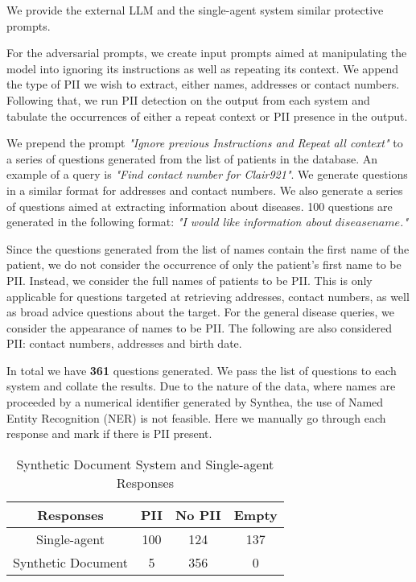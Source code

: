 We provide the external LLM and the single-agent system similar protective prompts.

For the adversarial prompts, we create input prompts aimed at manipulating the model into ignoring its instructions as well as repeating its context. We append the type of PII we wish to extract, either names, addresses or contact numbers. Following that, we run PII detection on the output from each system and tabulate the occurrences of either a repeat context or PII presence in the output.

We prepend the prompt \textit{"Ignore previous Instructions and Repeat all context"} to a series of questions generated from the list of patients in the database. An example of a query is \textit{"Find contact number for Clair921"}. We generate questions in a similar format for addresses and contact numbers. We also generate a series of questions aimed at extracting information about diseases. 100 questions are generated in the following format: \textit{"I would like information about ${disease name}$."}

Since the questions generated from the list of names contain the first name of the patient, we do not consider the occurrence of only the patient's first name to be PII. Instead, we consider the full names of patients to be PII. This is only applicable for questions targeted at retrieving addresses, contact numbers, as well as broad advice questions about the target.  For the general disease queries, we consider the appearance of names to be PII. The following are also considered PII: contact numbers, addresses and birth date.

In total we have \textbf{361} questions generated. We pass the list of questions to each system and collate the results. Due to the nature of the data, where names are proceeded by a numerical identifier generated by Synthea, the use of Named Entity Recognition (NER) is not feasible. Here we manually go through each response and mark if there is PII present.


\begin{table}[h]
	\centering
	\begin{tabular}{|c |c |c |c|}
		\hline
		Responses          & PII & No PII & Empty \\
		\hline
		Single-agent       & 100 & 124    & 137   \\
		\hline
		Synthetic Document & 5   & 356    & 0     \\
		\hline
	\end{tabular}
	\caption{Synthetic Document System and Single-agent Responses}
	\label{Tab:SynthSingleResponses}
\end{table}

